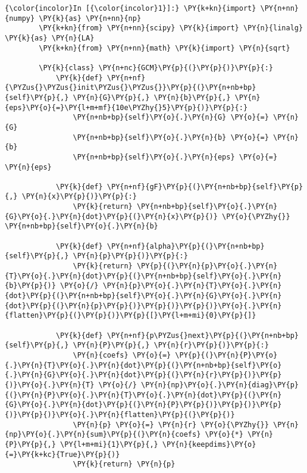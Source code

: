    \begin{Verbatim}[commandchars=\\\{\}]
{\color{incolor}In [{\color{incolor}1}]:} \PY{k+kn}{import} \PY{n+nn}{numpy} \PY{k}{as} \PY{n+nn}{np}
        \PY{k+kn}{from} \PY{n+nn}{scipy} \PY{k}{import} \PY{n}{linalg} \PY{k}{as} \PY{n}{LA}
        \PY{k+kn}{from} \PY{n+nn}{math} \PY{k}{import} \PY{n}{sqrt}
        
        \PY{k}{class} \PY{n+nc}{GCM}\PY{p}{(}\PY{p}{)}\PY{p}{:}
            \PY{k}{def} \PY{n+nf}{\PYZus{}\PYZus{}init\PYZus{}\PYZus{}}\PY{p}{(}\PY{n+nb+bp}{self}\PY{p}{,} \PY{n}{G}\PY{p}{,} \PY{n}{b}\PY{p}{,} \PY{n}{eps}\PY{o}{=}\PY{l+m+mf}{10e\PYZhy{}5}\PY{p}{)}\PY{p}{:}
                \PY{n+nb+bp}{self}\PY{o}{.}\PY{n}{G} \PY{o}{=} \PY{n}{G}
                \PY{n+nb+bp}{self}\PY{o}{.}\PY{n}{b} \PY{o}{=} \PY{n}{b}
                \PY{n+nb+bp}{self}\PY{o}{.}\PY{n}{eps} \PY{o}{=} \PY{n}{eps}
        
            \PY{k}{def} \PY{n+nf}{gF}\PY{p}{(}\PY{n+nb+bp}{self}\PY{p}{,} \PY{n}{x}\PY{p}{)}\PY{p}{:}
                \PY{k}{return} \PY{n+nb+bp}{self}\PY{o}{.}\PY{n}{G}\PY{o}{.}\PY{n}{dot}\PY{p}{(}\PY{n}{x}\PY{p}{)} \PY{o}{\PYZhy{}} \PY{n+nb+bp}{self}\PY{o}{.}\PY{n}{b}
        
            \PY{k}{def} \PY{n+nf}{alpha}\PY{p}{(}\PY{n+nb+bp}{self}\PY{p}{,} \PY{n}{p}\PY{p}{)}\PY{p}{:}
                \PY{k}{return} \PY{p}{(}\PY{n}{p}\PY{o}{.}\PY{n}{T}\PY{o}{.}\PY{n}{dot}\PY{p}{(}\PY{n+nb+bp}{self}\PY{o}{.}\PY{n}{b}\PY{p}{)} \PY{o}{/} \PY{n}{p}\PY{o}{.}\PY{n}{T}\PY{o}{.}\PY{n}{dot}\PY{p}{(}\PY{n+nb+bp}{self}\PY{o}{.}\PY{n}{G}\PY{o}{.}\PY{n}{dot}\PY{p}{(}\PY{n}{p}\PY{p}{)}\PY{p}{)}\PY{p}{)}\PY{o}{.}\PY{n}{flatten}\PY{p}{(}\PY{p}{)}\PY{p}{[}\PY{l+m+mi}{0}\PY{p}{]}
        
            \PY{k}{def} \PY{n+nf}{p\PYZus{}next}\PY{p}{(}\PY{n+nb+bp}{self}\PY{p}{,} \PY{n}{P}\PY{p}{,} \PY{n}{r}\PY{p}{)}\PY{p}{:}
                \PY{n}{coefs} \PY{o}{=} \PY{p}{(}\PY{n}{P}\PY{o}{.}\PY{n}{T}\PY{o}{.}\PY{n}{dot}\PY{p}{(}\PY{n+nb+bp}{self}\PY{o}{.}\PY{n}{G}\PY{o}{.}\PY{n}{dot}\PY{p}{(}\PY{n}{r}\PY{p}{)}\PY{p}{)}\PY{o}{.}\PY{n}{T} \PY{o}{/} \PY{n}{np}\PY{o}{.}\PY{n}{diag}\PY{p}{(}\PY{n}{P}\PY{o}{.}\PY{n}{T}\PY{o}{.}\PY{n}{dot}\PY{p}{(}\PY{n}{G}\PY{o}{.}\PY{n}{dot}\PY{p}{(}\PY{n}{P}\PY{p}{)}\PY{p}{)}\PY{p}{)}\PY{p}{)}\PY{o}{.}\PY{n}{flatten}\PY{p}{(}\PY{p}{)}
                \PY{n}{p} \PY{o}{=} \PY{n}{r} \PY{o}{\PYZhy{}} \PY{n}{np}\PY{o}{.}\PY{n}{sum}\PY{p}{(}\PY{n}{coefs} \PY{o}{*} \PY{n}{P}\PY{p}{,} \PY{l+m+mi}{1}\PY{p}{,} \PY{n}{keepdims}\PY{o}{=}\PY{k+kc}{True}\PY{p}{)}
                \PY{k}{return} \PY{n}{p}
        

\end{Verbatim}
